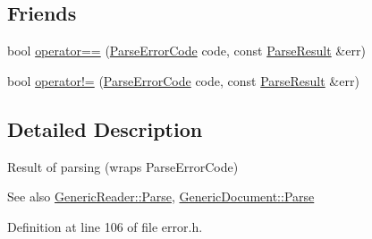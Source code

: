 \subsection*{Friends}
\begin{DoxyCompactItemize}
\item 
bool \mbox{\hyperlink{structrapidjson_1_1_parse_result_a58c9982e833d1c74686506ac7449200c}{operator==}} (\mbox{\hyperlink{group___r_a_p_i_d_j_s_o_n___e_r_r_o_r_s_ga7d3acf640886b1f2552dc8c4cd6dea60}{Parse\+Error\+Code}} code, const \mbox{\hyperlink{structrapidjson_1_1_parse_result}{Parse\+Result}} \&err)
\item 
bool \mbox{\hyperlink{structrapidjson_1_1_parse_result_a0498aebcfdd3d4a5dcb989ee29b93d4d}{operator!=}} (\mbox{\hyperlink{group___r_a_p_i_d_j_s_o_n___e_r_r_o_r_s_ga7d3acf640886b1f2552dc8c4cd6dea60}{Parse\+Error\+Code}} code, const \mbox{\hyperlink{structrapidjson_1_1_parse_result}{Parse\+Result}} \&err)
\end{DoxyCompactItemize}


\subsection{Detailed Description}
Result of parsing (wraps Parse\+Error\+Code) 


\begin{DoxyCode}{0}
\DoxyCodeLine{\}}
\end{DoxyCode}
 \begin{DoxySeeAlso}{See also}
\mbox{\hyperlink{classrapidjson_1_1_generic_reader_ac9c540b77de19661f6f45e04b9b0937b}{Generic\+Reader\+::\+Parse}}, \mbox{\hyperlink{classrapidjson_1_1_generic_document_aea842b533a858c9a3861451ad9e8642c}{Generic\+Document\+::\+Parse}} 
\end{DoxySeeAlso}


Definition at line 106 of file error.\+h.



